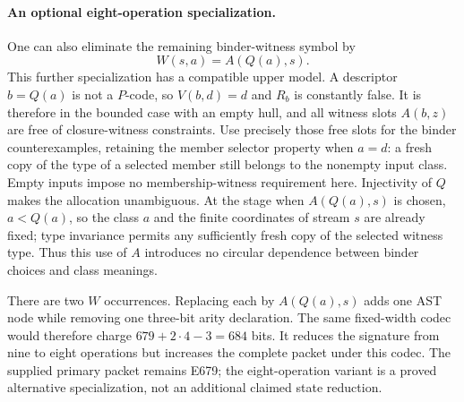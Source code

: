 \paragraph{An optional eight-operation specialization.}
One can also eliminate the remaining binder-witness symbol by
\[
                    W(s,a)=A(Q(a),s).
\]
This further specialization has a compatible upper model.  A descriptor
$b=Q(a)$ is not a $P$-code, so $V(b,d)=d$ and $R_b$ is constantly false.
It is therefore in the bounded case with an empty hull, and all witness
slots $A(b,z)$ are free of closure-witness constraints.  Use precisely
those free slots for the binder counterexamples, retaining the member
selector property when $a=d$: a fresh copy of the type of a selected
member still belongs to the nonempty input class. Empty inputs impose no
membership-witness requirement here.  Injectivity of $Q$ makes the allocation
unambiguous.  At the stage when $A(Q(a),s)$ is chosen, $a<Q(a)$, so the
class $a$ and the finite coordinates of stream $s$ are already fixed;
type invariance permits any sufficiently fresh copy of the selected
witness type.  Thus this use of $A$ introduces no circular dependence
between binder choices and class meanings.

There are two $W$ occurrences.  Replacing each by $A(Q(a),s)$ adds one
AST node while removing one three-bit arity declaration.  The same
fixed-width codec would therefore charge $679+2\cdot4-3=684$ bits.
It reduces the signature from nine to eight operations but increases
the complete packet under this codec.  The supplied primary packet
remains E679; the eight-operation variant is a proved alternative
specialization, not an additional claimed state reduction.
